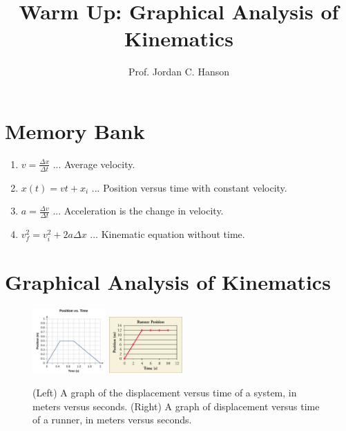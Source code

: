 \documentclass{article}
\begin{document}
\title{Warm Up: Graphical Analysis of Kinematics}
\author{Prof. Jordan C. Hanson}

\maketitle

\section{Memory Bank}

\begin{enumerate}
\item $v = \frac{\Delta x}{\Delta t}$ ... Average velocity.
\item $x(t) = v t + x_i$ ... Position versus time with constant velocity.
\item $a = \frac{\Delta v}{\Delta t}$ ... Acceleration is the change in velocity.
\item $v_f^2 = v_i^2 + 2 a \Delta x$ ... Kinematic equation without time.
\end{enumerate}

\section{Graphical Analysis of Kinematics}

\begin{figure}[ht]
\centering
\includegraphics[width=0.25\textwidth]{figures/x_vs_t.png} \hspace{0.5cm}
\includegraphics[width=0.25\textwidth]{figures/run.jpeg}
\caption{\label{fig:graph} (Left) A graph of the displacement versus time of a system, in meters versus seconds. (Right) A graph of displacement versus time of a runner, in meters versus seconds.}
\end{figure}
\end{document}
